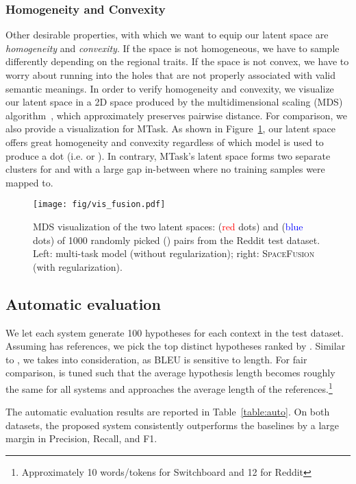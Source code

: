 \documentclass[11pt,a4paper]{article}
\begin{document}
\subsubsection{Homogeneity and Convexity} 
Other desirable properties, with which we want to equip our latent space are \textit{homogeneity} and \textit{convexity}. If the space is not homogeneous, we have to sample differently depending on the regional traits. If the space is not convex, we have to worry about running into the holes that are not properly associated with valid semantic meanings.
In order to verify homogeneity and convexity, we visualize our latent space in a 2D space produced by the multidimensional scaling (MDS) algorithm~\cite{borg2003mds}, which approximately preserves pairwise distance. For comparison, we also provide a visualization for MTask. As shown in Figure~\ref{fig:vis_fusion}, our latent space offers great homogeneity and convexity regardless of which model is used to produce a dot (i.e.  or ). In contrary, MTask's latent space forms two separate clusters for  and  with a large gap in-between where no training samples were mapped to.

\begin{figure}[ht]
    \centering
    \texttt{[image: fig/vis\_fusion.pdf]}
    \caption{MDS visualization of the two latent spaces:  (\textcolor{red}{red} dots) and  (\textcolor{blue}{blue} dots) of 1000 randomly picked () pairs from the Reddit test dataset. Left: multi-task model (without regularization); right: \textsc{SpaceFusion} (with regularization).}
    \label{fig:vis_fusion}
\end{figure}


\subsection{Automatic evaluation}

We let each system generate 100 hypotheses  for each context  in the test dataset. Assuming  has  references, we pick the top  distinct hypotheses ranked by . Similar to \cite{li2016mmi, wu2016google}, we takes  into consideration, as BLEU is sensitive to length. For fair comparison,  is tuned such that the average hypothesis length becomes roughly the same for all systems and approaches the average length of the references.\footnote{Approximately 10 words/tokens for Switchboard and 12 for Reddit}

The automatic evaluation results are reported in Table~\ref{table:auto}. On both datasets, the proposed system consistently outperforms the baselines by a large margin in Precision, Recall, and F1.
\end{document}
